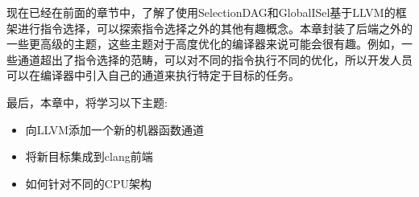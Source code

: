 现在已经在前面的章节中，了解了使用SelectionDAG和GlobalISel基于LLVM的框架进行指令选择，可以探索指令选择之外的其他有趣概念。本章封装了后端之外的一些更高级的主题，这些主题对于高度优化的编译器来说可能会很有趣。例如，一些通道超出了指令选择的范畴，可以对不同的指令执行不同的优化，所以开发人员可以在编译器中引入自己的通道来执行特定于目标的任务。

最后，本章中，将学习以下主题:

\begin{itemize}
\item
向LLVM添加一个新的机器函数通道

\item
将新目标集成到clang前端

\item
如何针对不同的CPU架构
\end{itemize}


















